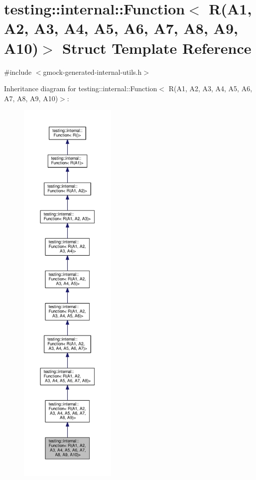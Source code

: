 \hypertarget{structtesting_1_1internal_1_1_function_3_01_r_07_a1_00_01_a2_00_01_a3_00_01_a4_00_01_a5_00_01_a6f6ff91550f0557b7708e490e5002cd35}{}\section{testing\+:\+:internal\+:\+:Function$<$ R(A1, A2, A3, A4, A5, A6, A7, A8, A9, A10)$>$ Struct Template Reference}
\label{structtesting_1_1internal_1_1_function_3_01_r_07_a1_00_01_a2_00_01_a3_00_01_a4_00_01_a5_00_01_a6f6ff91550f0557b7708e490e5002cd35}


{\ttfamily \#include $<$gmock-\/generated-\/internal-\/utils.\+h$>$}



Inheritance diagram for testing\+:\+:internal\+:\+:Function$<$ R(A1, A2, A3, A4, A5, A6, A7, A8, A9, A10)$>$\+:
\nopagebreak
\begin{figure}[H]
\begin{center}
\leavevmode
\includegraphics[height=550pt]{structtesting_1_1internal_1_1_function_3_01_r_07_a1_00_01_a2_00_01_a3_00_01_a4_00_01_a5_00_01_a697aa8fe85a89666d749983fe56b1a994}
\end{center}
\end{figure}


